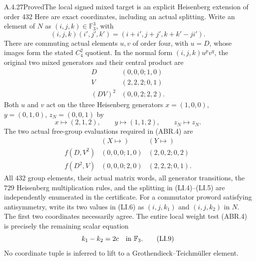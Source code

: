 \begin{result}{A.4.27}{Proved}{The local signed mixed target is an explicit Heisenberg extension of order 432}
Here are exact coordinates, including an actual splitting.
Write an element of $N$ as $(i,j,k)\in\mathbb F_3^3$, with
\[
 (i,j,k)(i',j',k')=(i+i',j+j',k+k'-ji').                 \tag{LI.3}
\]
There are commuting actual elements $u,v$ of order four,
with $u=D$, whose images form the stated $C_4^2$ quotient.
In the normal form $(i,j,k)u^p v^q$, the original two
mixed generators and their central product are
\[
\begin{array}{c|c}
 D&(0,0,0;1,0)\\
 V&(2,2,2;0,1)\\
 (DV)^2&(0,0,2;2,2).
\end{array}                                                    \tag{LI.4}
\]
Both $u$ and $v$ act on the three Heisenberg generators
$x=(1,0,0)$, $y=(0,1,0)$, $z_N=(0,0,1)$ by
\[
 x\longmapsto(2,1,2),\qquad
 y\longmapsto(1,1,2),\qquad z_N\longmapsto z_N.         \tag{LI.5}
\]
The two actual free-group evaluations required in (ABR.4) are
\[
\begin{array}{c|cc}
 &(X\mapsto)&(Y\mapsto)\\ \hline
 f(D,V^2)&(0,0,0;1,0)&(2,0,2;0,2)\\
 f(D^2,V)&(0,0,0;2,0)&(2,2,2;0,1).
\end{array}                                                    \tag{LI.6}
\]
All $432$ group elements, their actual matrix words, all generator
transitions, the $729$ Heisenberg multiplication rules, and the
splitting in (LI.4)--(LI.5) are independently enumerated in the
certificate.
For a commutator proword satisfying antisymmetry, write its two
values in (LI.6) as $(i,j,k_1)$ and $(i,j,k_2)$ in $N$.
The first two coordinates necessarily agree.  The entire local
weight test (ABR.4) is precisely the remaining scalar equation
\[
                         k_1-k_2=2c\quad\hbox{in }\mathbb F_3.
                                                               \tag{LI.9}
\]
  No coordinate tuple is inferred to lift to a
Grothendieck--Teichm\"uller element.
\end{result}

